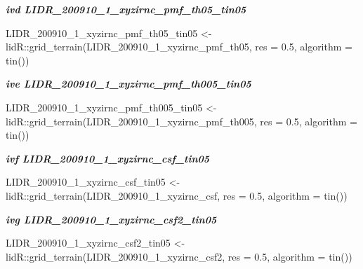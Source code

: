 \documentclass[
  12pt,
]{article}
\newenvironment{Shaded}{\begin{snugshade}}{\end{snugshade}}
\newcommand{\AttributeTok}[1]{\textcolor[rgb]{0.77,0.63,0.00}{#1}}
\newcommand{\FloatTok}[1]{\textcolor[rgb]{0.00,0.00,0.81}{#1}}
\newcommand{\FunctionTok}[1]{\textcolor[rgb]{0.00,0.00,0.00}{#1}}
\newcommand{\NormalTok}[1]{#1}
\newcommand{\OtherTok}[1]{\textcolor[rgb]{0.56,0.35,0.01}{#1}}
\newcommand{\SpecialCharTok}[1]{\textcolor[rgb]{0.00,0.00,0.00}{#1}}
\begin{document}
\textbf{\emph{ivd LIDR\_200910\_1\_xyzirnc\_pmf\_th05\_tin05}}

\begin{Shaded}
\begin{Highlighting}[]
\NormalTok{LIDR\_200910\_1\_xyzirnc\_pmf\_th05\_tin05 }\OtherTok{\textless{}{-}}\NormalTok{ lidR}\SpecialCharTok{::}\FunctionTok{grid\_terrain}\NormalTok{(LIDR\_200910\_1\_xyzirnc\_pmf\_th05,}
    \AttributeTok{res =} \FloatTok{0.5}\NormalTok{, }\AttributeTok{algorithm =} \FunctionTok{tin}\NormalTok{())}
\end{Highlighting}
\end{Shaded}

\textbf{\emph{ive LIDR\_200910\_1\_xyzirnc\_pmf\_th005\_tin05}}

\begin{Shaded}
\begin{Highlighting}[]
\NormalTok{LIDR\_200910\_1\_xyzirnc\_pmf\_th005\_tin05 }\OtherTok{\textless{}{-}}\NormalTok{ lidR}\SpecialCharTok{::}\FunctionTok{grid\_terrain}\NormalTok{(LIDR\_200910\_1\_xyzirnc\_pmf\_th005,}
    \AttributeTok{res =} \FloatTok{0.5}\NormalTok{, }\AttributeTok{algorithm =} \FunctionTok{tin}\NormalTok{())}
\end{Highlighting}
\end{Shaded}

\textbf{\emph{ivf LIDR\_200910\_1\_xyzirnc\_csf\_tin05}}

\begin{Shaded}
\begin{Highlighting}[]
\NormalTok{LIDR\_200910\_1\_xyzirnc\_csf\_tin05 }\OtherTok{\textless{}{-}}\NormalTok{ lidR}\SpecialCharTok{::}\FunctionTok{grid\_terrain}\NormalTok{(LIDR\_200910\_1\_xyzirnc\_csf,}
    \AttributeTok{res =} \FloatTok{0.5}\NormalTok{, }\AttributeTok{algorithm =} \FunctionTok{tin}\NormalTok{())}
\end{Highlighting}
\end{Shaded}

\textbf{\emph{ivg LIDR\_200910\_1\_xyzirnc\_csf2\_tin05}}

\begin{Shaded}
\begin{Highlighting}[]
\NormalTok{LIDR\_200910\_1\_xyzirnc\_csf2\_tin05 }\OtherTok{\textless{}{-}}\NormalTok{ lidR}\SpecialCharTok{::}\FunctionTok{grid\_terrain}\NormalTok{(LIDR\_200910\_1\_xyzirnc\_csf2,}
    \AttributeTok{res =} \FloatTok{0.5}\NormalTok{, }\AttributeTok{algorithm =} \FunctionTok{tin}\NormalTok{())}
\end{Highlighting}
\end{Shaded}
\end{document}
